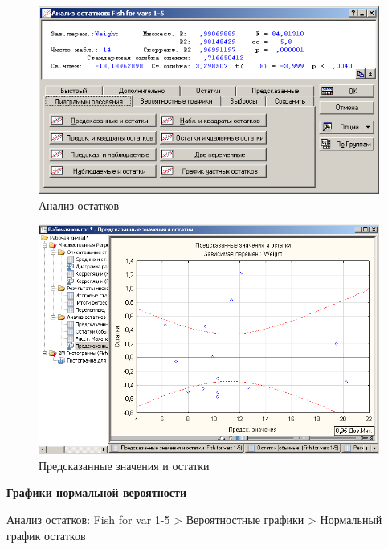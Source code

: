 \begin{figure}[!h]
  \centering

  \includegraphics[width=16cm]
  {inc/var5__33.PNG}

  \caption{Анализ остатков}

  \label{fig:var5__33}
\end{figure}

\begin{figure}[!h]
  \centering

  \includegraphics[width=16cm]
  {inc/var5__34.PNG}

  \caption{Предсказанные значения и остатки}

  \label{fig:var5__34}
\end{figure}

\newpage

\textbf{Графики нормальной вероятности}

Анализ остатков: Fish for var 1-5 > Вероятностные графики > Нормальный график остатков

